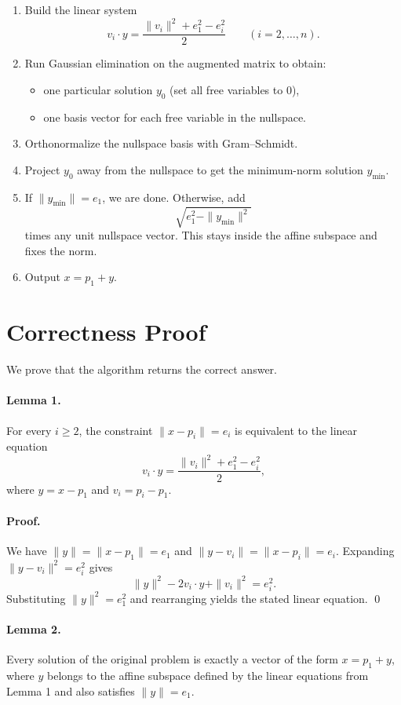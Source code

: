 \documentclass[11pt]{article}
\begin{document}
\begin{enumerate}[leftmargin=*]
    \item Build the linear system
    \[
        v_i \cdot y = \frac{\|v_i\|^2 + e_1^2 - e_i^2}{2}
        \qquad (i = 2,\dots,n).
    \]
    \item Run Gaussian elimination on the augmented matrix to obtain:
    \begin{itemize}[leftmargin=*]
        \item one particular solution $y_0$ (set all free variables to $0$),
        \item one basis vector for each free variable in the nullspace.
    \end{itemize}
    \item Orthonormalize the nullspace basis with Gram--Schmidt.
    \item Project $y_0$ away from the nullspace to get the minimum-norm solution $y_{\min}$.
    \item If $\|y_{\min}\| = e_1$, we are done.
    Otherwise, add
    \[
        \sqrt{e_1^2 - \|y_{\min}\|^2}
    \]
    times any unit nullspace vector. This stays inside the affine subspace and fixes the norm.
    \item Output $x = p_1 + y$.
\end{enumerate}

\section*{Correctness Proof}

We prove that the algorithm returns the correct answer.

\paragraph{Lemma 1.}
For every $i \ge 2$, the constraint $\|x-p_i\| = e_i$ is equivalent to the linear equation
\[
    v_i \cdot y = \frac{\|v_i\|^2 + e_1^2 - e_i^2}{2},
\]
where $y=x-p_1$ and $v_i=p_i-p_1$.

\paragraph{Proof.}
We have $\|y\|=\|x-p_1\|=e_1$ and $\|y-v_i\|=\|x-p_i\|=e_i$.
Expanding $\|y-v_i\|^2=e_i^2$ gives
\[
    \|y\|^2 - 2v_i \cdot y + \|v_i\|^2 = e_i^2.
\]
Substituting $\|y\|^2=e_1^2$ and rearranging yields the stated linear equation. \qed

\paragraph{Lemma 2.}
Every solution of the original problem is exactly a vector of the form $x=p_1+y$, where $y$ belongs to
the affine subspace defined by the linear equations from Lemma 1 and also satisfies $\|y\|=e_1$.
\end{document}
